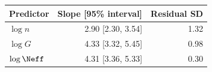 \begin{tabular}{@{}lrr@{}}
\toprule
Predictor & Slope [95\% interval] & Residual SD \\
\midrule
$\log n$ & 2.90 [2.30, 3.54] & 1.32 \\
$\log G$ & 4.33 [3.32, 5.45] & 0.98 \\
$\log\Neff$ & 4.31 [3.36, 5.33] & 0.30 \\
\bottomrule
\end{tabular}
